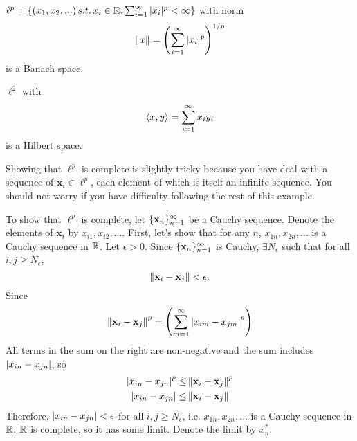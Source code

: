 \begin{example}
  $\ell^p = \{ (x_1, x_2, ...)\, s.t.\, x_i \in \mathbb{R}, \sum_{i=1}^\infty |x_i|^p <
  \infty \}$ with norm 
  \[ \left\Vert {x} \right\Vert = \left( \sum_{i=1}^\infty |x_i|^p \right)^{1/p} \]
  is a Banach space. 
  
  $\ell^2$ with 
  \[ \left\langle {x} , {y} \right\rangle = \sum_{i=1}^\infty x_i y_i \]
  is a Hilbert space. 
  
  Showing that $\ell^p$ is complete is slightly tricky because you
  have deal with a sequence of $\mathbf{x}_i \in \ell^p$, each element
  of which is itself an infinite sequence. You should not worry if you
  have difficulty following the rest of this example.
  
  To show that $\ell^p$ is complete, let $\{{\mathbf{x}}_n \}_{n=1}^\infty$ be a
  Cauchy sequence. Denote the elements of $\mathbf{x}_i$ by $x_{i1},
  x_{i2}, ... $. First, let's show that for any $n$, $x_{1n}, x_{2n},
  ... $ is a Cauchy sequence in $\mathbb{R}$. Let $\epsilon > 0$. Since
  $\{{\mathbf{x}}_n \}_{n=1}^\infty$ is Cauchy, $\exists N_\epsilon$ such that for all $i,j
  \geq N_\epsilon$, 
  \[  \left\Vert {\mathbf{x}_i - \mathbf{x}_j } \right\Vert < \epsilon. \]
  Since 
  \[ \left\Vert {\mathbf{x}_i - \mathbf{x}_j } \right\Vert^p = \left( \sum_{m=1}^\infty
    \left\vert {x_{i m} - x_{j m}} \right\vert^p \right) \]
  All terms in the sum on the right are non-negative and the sum
  includes $\left\vert {x_{i n} - x_{jn}} \right\vert$, so 
  \begin{align*} \left\vert {x_{i n} - x_{j n} } \right\vert^p \leq & \left\Vert {\mathbf{x}_i -
      \mathbf{x}_j } \right\Vert^p \\
    \left\vert {x_{i n} - x_{j n} } \right\vert \leq & 
    \left\Vert {\mathbf{x}_i - \mathbf{x}_j } \right\Vert  
  \end{align*}
  Therefore, $\left\vert {x_{i n} - x_{j n}} \right\vert < \epsilon$ for all $i,j \geq
  N_\epsilon$, i.e. $x_{1n}, x_{2n}, ...$ is a Cauchy sequence in
  $\mathbb{R}$. $\mathbb{R}$ is complete, so it has some limit. Denote the limit by
  $x^\ast_n$.  


\end{example}
